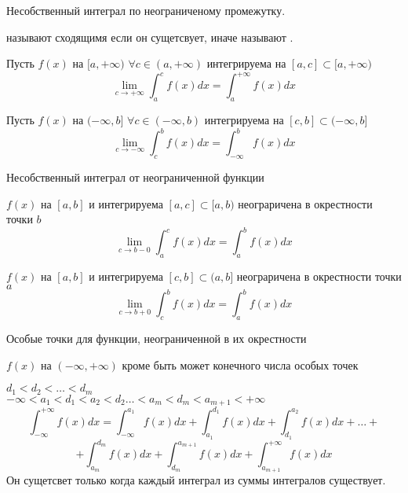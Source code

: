 \begin{title}[\Large]
    Несобственный интеграл по неограниченому промежутку.
\end{title}

 называют сходящимя если он сущетсвует,
иначе называют .

\begin{defin}
    Пусть $f(x)$ на $[a,+\infty)$ $\forall c \in (a, +\infty)$ интегрируема
    на $[a,c] \subset [a, +\infty)$
    \[\lim_{c \to +\infty} \int_a^c f(x)dx = \int_a^{+\infty} f(x)dx\]
\end{defin}

\begin{defin}
    Пусть $f(x)$ на $(-\infty, b]$ $\forall c \in (-\infty, b)$ интегрируема
    на $[c,b] \subset (-\infty, b]$
    \[\lim_{c \to -\infty} \int_c^b f(x)dx = \int_{-\infty}^b f(x)dx\]
\end{defin}

\begin{title}[\Large]
  Несобственный интеграл от неограниченной функции
\end{title}

\begin{defin}
    $f(x)$ на $[a,b]$ и интегрируема $[a,c] \subset [a,b)$ неограричена в
    окрестности точки $b$
    \[\lim_{c \to b -0} \int_a^c f(x)dx = \int_a^b f(x)dx\]
\end{defin}

\begin{defin}
    $f(x)$ на $[a,b]$ и интегрируема $[c,b] \subset (a,b]$ неограричена в
    окрестности точки $a$
    \[\lim_{c \to b +0} \int_c^b f(x)dx = \int_a^b f(x)dx\]
\end{defin}

\begin{title}[\Large]
  Особые точки для функции, неограниченной в их окрестности
\end{title}

\begin{defin}
    $f(x)$ на $(-\infty, +\infty)$ кроме быть может конечного числа особых точек

    $d_1 < d_2 < \ldots < d_m$\\
    $-\infty < a_1 < d_1 < a_2 < d_2 \ldots < a_m < d_m < a_{m+1} < +\infty$
    \[
        \int_{-\infty}^{+\infty} f(x)dx = \int_{-\infty}^{a_1}f(x)dx +
        \int_{a_1}^{d_1}f(x)dx + \int_{d_1}^{a_2}f(x)dx + \ldots +
    \]
    \[
        + \int_{a_m}^{d_m}f(x)dx + \int_{d_m}^{a_{m+1}}f(x)dx +
        \int_{a_{m+1}}^{+\infty}f(x)dx
    \]
        Он сущетсвет только когда каждый интеграл из суммы интегралов существует.
\end{defin}

